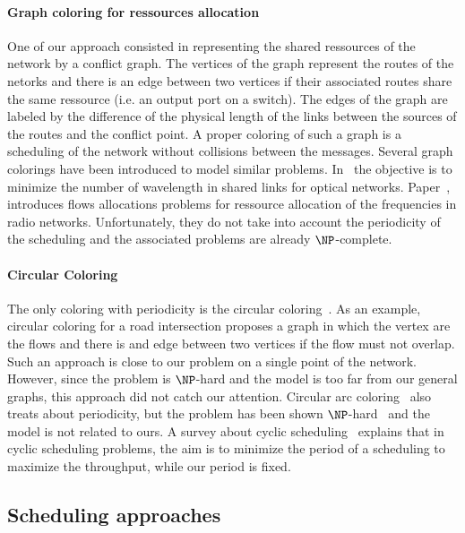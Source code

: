 \paragraph{Graph coloring for ressources allocation}
One of our approach consisted in representing the shared ressources of the network by a conflict graph. The vertices of the graph represent the routes of the netorks and there is an edge between two vertices if their associated routes share the same ressource (i.e. an output port on a switch). The edges of the graph are labeled by the difference of the physical length of the links between the sources of the routes and the conflict point. A proper coloring of such a graph is a scheduling of the network without collisions between the messages.
Several graph colorings have been introduced to model similar problems. In~\cite{erlebach2001complexity} the objective is to minimize the number of wavelength in shared links for optical networks. Paper~\cite{borndorfer1998frequency}, introduces flows allocations problems for ressource allocation of the frequencies in radio networks. Unfortunately, they do not take into account the periodicity of the scheduling and the associated problems are already $\NP$-complete. 

\paragraph{Circular Coloring}
The only coloring with periodicity is the circular coloring~\cite{ZHU2001371,zhou2013multiple}. As an example, circular coloring for a road intersection proposes a graph in which the vertex are the flows and there is and edge between two vertices if the flow must not overlap. Such an approach is close to our problem on a single point of the network. However, since the problem is $\NP$-hard and the model is too far from our general graphs, this approach did not catch our attention.
Circular arc coloring~\cite{10.2307/2100446} also treats about periodicity, but the problem has been shown $\NP$-hard~\cite{10.1007/BFb0053971} and the model is not related to ours.
A survey about cyclic scheduling~\cite{levner2010complexity} explains that in cyclic scheduling problems, the aim is to minimize the period of a scheduling to maximize the throughput, while our period is fixed. 

\subsection{Scheduling approaches}


